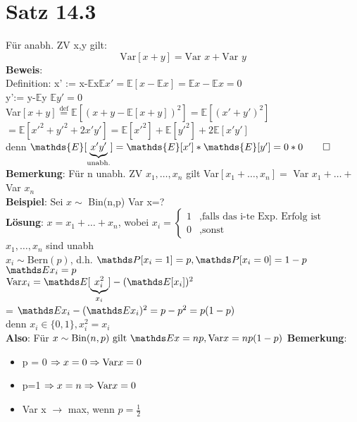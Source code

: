 \section{Satz 14.3}
Für anabh. ZV x,y gilt:
$$\text{Var}[x+y] = \text{Var }x+\text{Var }y$$
\textbf{Beweis}:\\
Definition: x' := x-$ \mathds{E} $x\hspace{1cm}$\mathds{E}x'=\mathds{E}[x-\mathds{E}x] = \mathds{E}x-\mathds{E}x=0$\medskip\\
y':= y-$\mathds{E}$y \hspace{1cm} $\mathds{E}y'=0$\medskip\\
Var$[x+y] \overset{\text{def}}{=} \mathds{E}[(x+y-\mathds{E}[x+y])^2] = \mathds{E}[(x'+y')^2]$\smallskip\\
$=\mathds{E}[x'^2+y'^2+2x'y'] = \mathds{E}[x'^2] + \mathds{E}[y'^2]+2\mathds{E}[x'y']$\medskip\\
denn $\mathds{E}[\underbrace{x'y'}_\text{unabh.}]=\mathds{E}[x']*\mathds{E}[y']=0*0\qed$\medskip\\
\textbf{Bemerkung}: Für n unabh. ZV $x_1,\dots,x_n$ gilt Var$[x_1+\dots,x_n] = $ Var $x_1+\dots + $Var $x_n$\medskip\\
\textbf{Beispiel}: Sei $x \sim $ Bin(n,p) \hspace{1cm} Var x=?\smallskip\\
\textbf{Lösung}: $ x=x_1+\dots+x_n$,  wobei $x_i=\begin{cases}
1&,\text{falls das i-te Exp. Erfolg ist}\\
0&,\text{sonst}
\end{cases}$\smallskip\\
$x_1,\dots,x_n$ sind unabh\\
$x_i \sim \text{Bern}(p)$, d.h. $\PP[x_i = 1]=p, \PP[x_i=0]=1-p$\\
$\E x_i=p$\\
$\var x_i = \E[\underbrace{x_i^2}_{x_i}]-(\E[x_i])^2$\\ = $\E x_i - (\E x_i)^2=p-p^2 = p(1-p)$\medskip\\
denn $x_i \in \{0,1\}, x_i^2=x_i$\medskip\\
\textbf{Also}: Für $x \sim \text{Bin}(n,p) \text{ gilt } \E x = np, \var x = np(1-p)$\newpage
\textbf{Bemerkung}:
\begin{itemize}
	\item  p = 0 $\Rightarrow x=0 \Rightarrow \text{Var} x = 0$
	\item p=1 $\Rightarrow x=n \Rightarrow \text{Var} x = 0$
	\item Var x $\rightarrow$ max, wenn $p=\frac{1}{2}$
\end{itemize}
